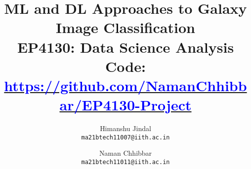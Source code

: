 \documentclass[10pt, twocolumn, letterpaper]{article}
\title{
    ML and DL Approaches to Galaxy Image Classification \\
    \large{\normalfont EP4130: Data Science Analysis} \\
    \normalfont Code: {\href{https://github.com/NamanChhibbar/EP4130-Project}{\textcolor{blue}{\normalfont https://github.com/NamanChhibbar/EP4130-Project}}}
}
\author{
    Himanshu Jindal \\
    {\tt\small ma21btech11007@iith.ac.in}
    \and
    Naman Chhibbar \\
    {\tt\small ma21btech11011@iith.ac.in}
}
\begin{document}
\maketitle
   









{
    \small
    \nocite{*}
    
}

% 
\end{document}
